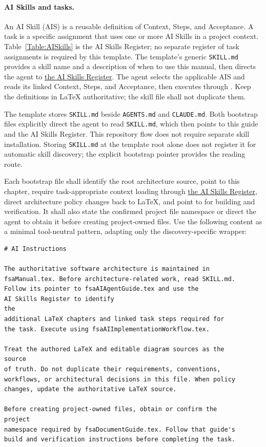 \paragraph{AI Skills and tasks.}
An AI Skill (AIS) is a reusable definition of Context, Steps, and Acceptance.
A task is a specific assignment that uses one or more AI Skills in a project
context. Table~\ref{Table:AISkills} is the AI Skills Register; no separate
register of task assignments is required by this template.
The template's generic \texttt{SKILL.md} provides a skill name and a description
of when to use this manual, then directs the agent to
\hyperref[Table:AISkills]{the AI Skills Register}. The agent selects the
applicable AIS and reads its linked Context, Steps, and Acceptance, then
executes through . Keep the definitions
in LaTeX authoritative; the skill file shall not duplicate them.

The template stores \texttt{SKILL.md} beside \texttt{AGENTS.md} and
\texttt{CLAUDE.md}. Both bootstrap files explicitly direct the agent to read
\texttt{SKILL.md}, which then points to this guide and the AI Skills Register.
This repository flow does not require separate skill installation. Storing
\texttt{SKILL.md} at the template root alone does not register it for automatic
skill discovery; the explicit bootstrap pointer provides the reading route.

Each bootstrap file shall identify the root architecture source, point to this
chapter, require task-appropriate context loading through
\hyperref[Table:AISkills]{the AI Skills Register}, direct architecture
policy changes back to LaTeX, and point to  for
building and verification. It shall also state the confirmed project file
namespace or direct the agent to obtain it before creating project-owned files.
Use the following content as a minimal tool-neutral pattern, adapting only the
discovery-specific wrapper:

\begin{verbatim}
# AI Instructions

The authoritative software architecture is maintained in
fsaManual.tex. Before architecture-related work, read SKILL.md.
Follow its pointer to fsaAIAgentGuide.tex and use the
AI Skills Register to identify
the
additional LaTeX chapters and linked task steps required for
the task. Execute using fsaAIImplementationWorkflow.tex.

Treat the authored LaTeX and editable diagram sources as the
source
of truth. Do not duplicate their requirements, conventions,
workflows, or architectural decisions in this file. When policy
changes, update the authoritative LaTeX source.

Before creating project-owned files, obtain or confirm the
project
namespace required by fsaDocumentGuide.tex. Follow that guide's
build and verification instructions before completing the task.
\end{verbatim}

